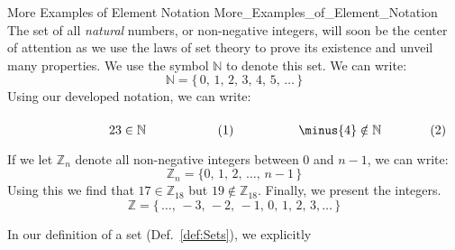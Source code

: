     \begin{lexample}{More Examples of Element Notation}
                    {More_Examples_of_Element_Notation}
        The set of all \textit{natural} numbers, or non-negative integers,
        will soon be the center of attention as we use the laws of set theory
        to prove its existence and unveil many properties. We use the symbol
        $\mathbb{N}$ to denote this set. We can write:
        \begin{equation}
            \label{eqn:Natural_Numbers_Ellipses}%
            \mathbb{N}=\{\,0,\,1,\,2,\,3,\,4,\,5,\,\dots\,\}
        \end{equation}
        Using our developed notation, we can write:
        \par\hfill\par
        \begin{subequations}
            \begin{minipage}[b]{0.49\textwidth}
                \begin{equation}
                    23\in\mathbb{N}
                \end{equation}
            \end{minipage}
            \hfill
            \begin{minipage}[b]{0.49\textwidth}
                \begin{equation}
                    \minus{4}\notin\mathbb{N}
                \end{equation}
            \end{minipage}
        \end{subequations}
        \par\vspace{2.5ex}
        If we let $\mathbb{Z}_{n}$ denote all non-negative integers
        between $0$ and $n-1$, we can write:
        \begin{equation}
            \label{eqn:Z_n_Ellipses}%
            \mathbb{Z}_{n}=\{0,\,1,\,2,\,\dots,\,n-1\,\}
        \end{equation}
        Using this we find that $17\in\mathbb{Z}_{18}$ but
        $19\notin\mathbb{Z}_{18}$. Finally, we present the integers.
        \begin{equation}
            \label{eqn:Integers_Ellipses}%
            \mathbb{Z}=\{\,\dots,\,\minus{3},\,\minus{2},\,\minus{1},
                            \,0,\,1,\,2,\,3,\dots\,\}
        \end{equation}
    \end{lexample}
    In our definition of a set (Def.~\ref{def:Sets}), we explicitly
